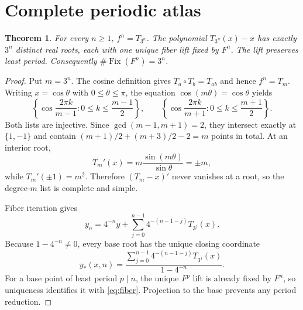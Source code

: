 \documentclass[10pt]{article}
\newtheorem{theorem}{Theorem}
\newcommand{\Fix}{\operatorname{Fix}}
\begin{document}
\section{Complete periodic atlas}
\begin{theorem}\label{thm:atlas}
For every $n\ge1$, $f^n=T_{3^n}$.  The polynomial
$T_{3^n}(x)-x$ has exactly $3^n$ distinct real roots, each with one unique
fiber lift fixed by $F^n$.  The lift preserves least period.  Consequently
$\#\Fix(F^n)=3^n$.
\end{theorem}
\begin{proof}
Put $m=3^n$.  The cosine definition gives
$T_a\circ T_b=T_{ab}$ and hence $f^n=T_m$.  Writing $x=\cos\theta$ with
$0\le\theta\le\pi$, the equation $\cos(m\theta)=\cos\theta$ yields
\[
 \left\{\cos\frac{2\pi k}{m-1}:0\le k\le\frac{m-1}{2}\right\},\qquad
 \left\{\cos\frac{2\pi k}{m+1}:0\le k\le\frac{m+1}{2}\right\}.
\]
Both lists are injective.  Since $\gcd(m-1,m+1)=2$, they intersect exactly at
$\{1,-1\}$ and contain
$(m+1)/2+(m+3)/2-2=m$ points in total.  At an interior root,
\[
 T_m'(x)=m\frac{\sin(m\theta)}{\sin\theta}=\pm m,
\]
while $T_m'(\pm1)=m^2$.  Therefore $(T_m-x)'$ never vanishes at a root,
so the degree-$m$ list is complete and simple.

Fiber iteration gives
\[
 y_n=4^{-n}y+\sum_{j=0}^{n-1}4^{-(n-1-j)}T_{3^j}(x).
\]
Because $1-4^{-n}\ne0$, every base root has the unique closing coordinate
\begin{equation}\label{eq:fiber}
 y_*(x,n)=\frac{\sum_{j=0}^{n-1}4^{-(n-1-j)}T_{3^j}(x)}{1-4^{-n}}.
\end{equation}
For a base point of least period $p\mid n$, the unique $F^p$ lift is already
fixed by $F^n$, so uniqueness identifies it with \eqref{eq:fiber}.  Projection
to the base prevents any period reduction.
\end{proof}
\end{document}
